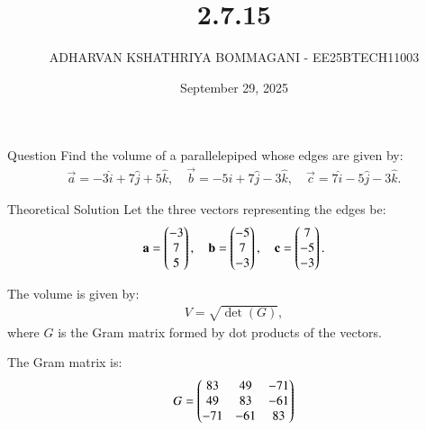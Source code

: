 \documentclass{beamer}
\title{2.7.15}
\date{September 29, 2025}
\author{ADHARVAN KSHATHRIYA BOMMAGANI - EE25BTECH11003}
\begin{document}
\frame{\titlepage}

\begin{frame}{Question}
Find the volume of a parallelepiped whose edges are given by:
\begin{align*}
\vec{a} = -3\hat{i} + 7\hat{j} + 5\hat{k}, \quad
\vec{b} = -5\hat{i} + 7\hat{j} - 3\hat{k}, \quad
\vec{c} = 7\hat{i} - 5\hat{j} - 3\hat{k}.
\end{align*}
\end{frame}

\begin{frame}{Theoretical Solution}
Let the three vectors representing the edges be:
\begin{align*}
\mathbf{a} = \begin{pmatrix}-3 \\ 7 \\ 5\end{pmatrix}, \quad
\mathbf{b} = \begin{pmatrix}-5 \\ 7 \\ -3\end{pmatrix}, \quad
\mathbf{c} = \begin{pmatrix}7 \\ -5 \\ -3\end{pmatrix}.
\end{align*}

The volume is given by:
\begin{align*}
V = \sqrt{\det(G)},
\end{align*}
where \(G\) is the Gram matrix formed by dot products of the vectors.

The Gram matrix is:
\begin{align*}
G = 
\begin{pmatrix}
83 & 49 & -71 \\
49 & 83 & -61 \\
-71 & -61 & 83
\end{pmatrix}
\end{align*}
\end{frame}
\end{document}
